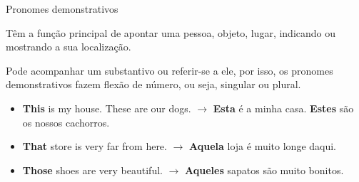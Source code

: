 \documentclass[compress,mathserif,xcolor=table]{beamer}
\begin{document}

\begin{frame}{Pronomes demonstrativos}

Têm a função principal de apontar uma pessoa, objeto, lugar, indicando ou mostrando a sua localização. 

\vspace{0.25cm}   

Pode acompanhar um substantivo ou referir-se a ele, por isso, os pronomes demonstrativos fazem flexão de número, ou seja, singular ou plural.

\vspace{0.25cm}   

\begin{itemize}
    \item \textbf{This} is my house. These are our dogs. $\rightarrow$ \textbf{Esta} é a minha casa. \textbf{Estes} são os nossos cachorros.
    \item \textbf{That} store is very far from here. $\rightarrow$ \textbf{Aquela} loja é muito longe daqui.
    \item \textbf{Those} shoes are very beautiful. $\rightarrow$ \textbf{Aqueles} sapatos são muito bonitos. 
\end{itemize}

\end{frame}

\end{document}
